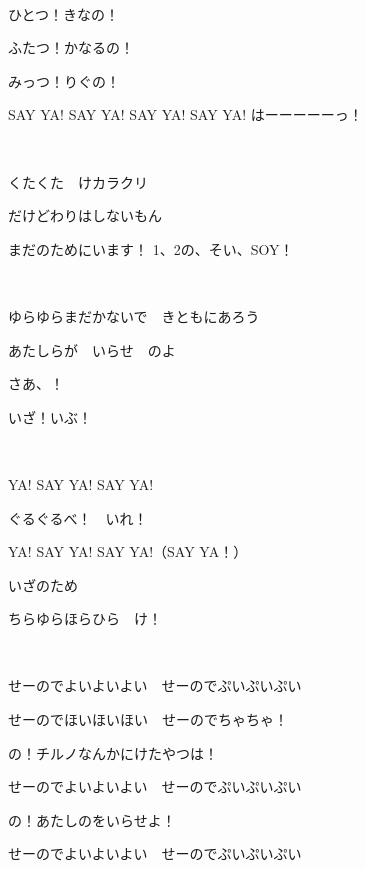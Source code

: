 ~

ひとつ！きなの！

ふたつ！かなるの！

みっつ！りぐの！

SAY YA! SAY YA! SAY YA! SAY YA! はーーーーーっ！

~

くたくた　けカラクリ

だけどわりはしないもん

まだのためにいます！ 1、2の、そい、SOY！

~

ゆらゆらまだかないで　きともにあろう

あたしらが　いらせ　のよ

さあ、！

いざ！いぶ！

~

YA! SAY YA! SAY YA!

ぐるぐるべ！　いれ！

YA! SAY YA! SAY YA!（SAY YA！）

いざのため

ちらゆらほらひら　け！

~

せーのでよいよいよい　せーのでぷいぷいぷい

せーのでほいほいほい　せーのでちゃちゃ！

の！チルノなんかにけたやつは！

せーのでよいよいよい　せーのでぷいぷいぷい

の！あたしのをいらせよ！

せーのでよいよいよい　せーのでぷいぷいぷい

